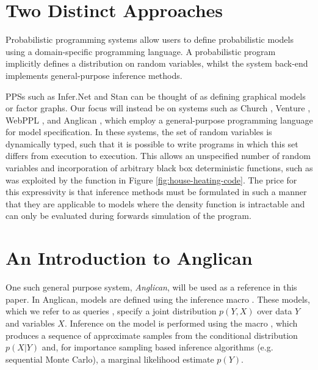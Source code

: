 

\section{Two Distinct Approaches}
\label{sec:probprog:two}

Probabilistic programming systems allow users to define probabilistic models using a domain-specific programming language. A probabilistic program implicitly defines a distribution on random variables, whilst the system back-end implements general-purpose inference methods.  

PPSs such as Infer.Net \citep{minka_software_2010} and Stan \citep{carpenter2015stan} can be thought of as defining graphical models or factor graphs.  Our focus will instead be on systems such as Church \citep{goodman_uai_2008}, Venture \citep{mansinghka2014venture}, WebPPL \citep{goodman_book_2014}, and Anglican \citep{wood2014new}, which employ a general-purpose programming language for model specification. In these systems, the set of random variables is dynamically typed, such that it is possible to write programs in which this set differs from execution to execution.  This allows an unspecified number of random variables and incorporation of arbitrary black box deterministic functions, such as was exploited by the \simulatec function in Figure \ref{fig:house-heating-code}. The price for this expressivity is that inference methods must be formulated in such a manner that they are applicable to models where the density function is intractable and can only be evaluated during forwards simulation of the program. 


\section{An Introduction to Anglican}
\label{sec:probprog:anglican}

One such general purpose system, \emph{Anglican}, will be used as a reference in this paper.  In Anglican, models are defined using the inference macro . These models, which we refer to as queries \citep{goodman_uai_2008}, specify a joint distribution $p(Y,X)$ over data $Y$ and variables $X$. Inference on the model is performed using the macro \doquery, which produces a sequence of approximate samples from the conditional distribution $p(X|Y)$ and, for importance sampling based inference algorithms (e.g. sequential Monte Carlo), a marginal likelihood estimate $p(Y)$.  

